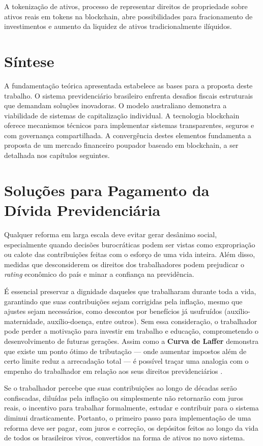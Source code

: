 A tokenização de ativos, processo de representar direitos de propriedade sobre ativos reais em tokens na blockchain, abre possibilidades para fracionamento de investimentos e aumento da liquidez de ativos tradicionalmente ilíquidos.

\section{Síntese}

A fundamentação teórica apresentada estabelece as bases para a proposta deste trabalho. O sistema previdenciário brasileiro enfrenta desafios fiscais estruturais que demandam soluções inovadoras. O modelo australiano demonstra a viabilidade de sistemas de capitalização individual. A tecnologia blockchain oferece mecanismos técnicos para implementar sistemas transparentes, seguros e com governança compartilhada. A convergência destes elementos fundamenta a proposta de um mercado financeiro poupador baseado em blockchain, a ser detalhada nos capítulos seguintes.

\section{Soluções para Pagamento da Dívida Previdenciária}

Qualquer reforma em larga escala deve evitar gerar desânimo social, especialmente quando decisões burocráticas podem ser vistas como expropriação ou calote das contribuições feitas com o esforço de uma vida inteira. Além disso, medidas que desconsiderem os direitos dos trabalhadores podem prejudicar o \textit{rating} econômico do país e minar a confiança na previdência.

É essencial preservar a dignidade daqueles que trabalharam durante toda a vida, garantindo que suas contribuições sejam corrigidas pela inflação, mesmo que ajustes sejam necessários, como descontos por benefícios já usufruídos (auxílio-maternidade, auxílio-doença, entre outros). Sem essa consideração, o trabalhador pode perder a motivação para investir em trabalho e educação, comprometendo o desenvolvimento de futuras gerações. Assim como a \textbf{Curva de Laffer} demonstra que existe um ponto ótimo de tributação --- onde aumentar impostos além de certo limite reduz a arrecadação total --- é possível traçar uma analogia com o empenho do trabalhador em relação aos seus direitos previdenciários \cite{laffer2004}.

Se o trabalhador percebe que suas contribuições ao longo de décadas serão confiscadas, diluídas pela inflação ou simplesmente não retornarão com juros reais, o incentivo para trabalhar formalmente, estudar e contribuir para o sistema diminui drasticamente. Portanto, o primeiro passo para implementação de uma reforma deve ser pagar, com juros e correção, os depósitos feitos ao longo da vida de todos os brasileiros vivos, convertidos na forma de ativos no novo sistema.

